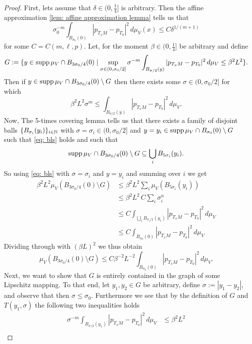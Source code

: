 \begin{proof}
First, lets assume that $\delta \in (0,\frac{1}{4}]$ is arbitrary. Then the affine approximation \cref{lem: affine approximation lemma} tells us that
\begin{equation}
    \sigma_0^{-m} \int_{ B_{\sigma_0}(0) } |p_{T_xM} - p_{T_0}|^2\, d\mu_V(x) \le C\delta^{1/(m+1)}
\end{equation}
for some $C=C(m, \ell, p)$. Let, for the moment $\beta\in(0,\frac{1}{4}]$ be arbitrary and define
\[
    G := \{ y \in \operatorname{supp} \mu_V \cap B_{ 3\sigma_0/4 }(0) \mid \sup_{\sigma \in (0,\sigma_0/2]} \sigma^{-m} \int_{B_{\sigma/2}(y)} |p_{T_xM} - p_{T_0}|^2 \, d\mu_V \le \beta^2 L^2 \}.
\]
Then if $y \in \operatorname{supp} \mu_V \cap B_{3\sigma_0/4}(0) \setminus G$ then there exists some $\sigma \in (0,\sigma_0/2]$ for which
\begin{equation}
    \beta^2L^2\sigma^m \le \int_{B_{\sigma/2}(y)} |p_{T_xM} - p_{T_0}|^2 \, d\mu_V.\label{eq: bls}
\end{equation}
Now, The 5-times covering lemma tells us that there exists a family of disjoint balls $\{B_{\sigma_i}(y_i)\}_{i \in \mathbb{N}}$ with $\sigma = \sigma_i \in (0,\sigma_0/2]$ and $y=y_i \in \operatorname{supp} \mu_V \cap B_{\sigma_0}(0) \setminus G$ such that \eqref{eq: bls} holds and such that
\[
    \operatorname{supp} \mu_V \cap B_{3\sigma_0/4}(0) \setminus G \subseteq \bigcup_i B_{5\sigma_i}(y_i).
\]
So using \eqref{eq: bls} with $\sigma = \sigma_i$ and $y=y_i$ and summing over $i$ we get
\begin{align*}
    \beta^2 L^2 \mu_V(B_{3\sigma_0/4}(0) \setminus G) &\le \beta^2 L^2 \sum_i \mu_V(B_{5\sigma_i}(y_i)) \\
    &\le \beta^2 L^2\, C \sum_i \sigma_i^n \\
    &\le C \int_{\bigcup_iB_{\sigma_i/2}(y_i)} |p_{T_xM} - p_{T_0}|^2 \, d\mu_V \\
    &\le C \int_{B_{\sigma_0}(0)} |p_{T_xM} - p_{T_0}|^2 \, d\mu_V
\end{align*}
Dividing through with $(\beta L)^2$ we thus obtain
\[
    \mu_V(B_{3\sigma_0/4}(0) \setminus G)\le C\beta^{-2}L^{-2} \int_{B_{\sigma_0}(0)} |p_{T_xM} - p_{T_0}|^2 \, d\mu_V.
\]
Next, we want to show that $G$ is entirely contained in the graph of some Lipschitz mapping. To that end, let $y_1,y_2 \in G$ be arbitrary, define $\sigma :=|y_1-y_2|$, and observe that then $\sigma \le \sigma_0$. Furthermore we see that by the definition of $G$ and $T(y_1,\sigma)$ the following two inequalities holds
\begin{align*}
    \sigma^{-m} \int_{B_{\sigma/2}(y_1)} |p_{T_xM} - p_{T_0}|^2 \, d\mu_V &\le \beta^2L^2 \\

\end{align*}
\end{proof}
